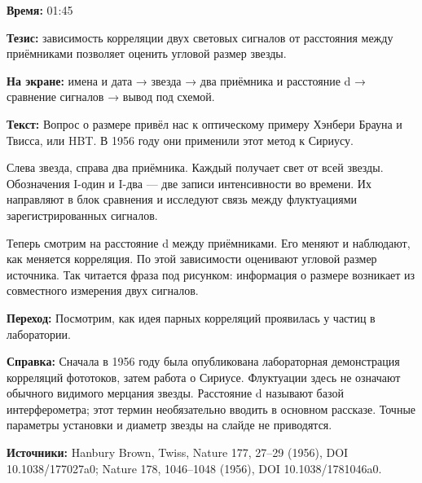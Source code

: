 \textbf{Время:} 01:45

\textbf{Тезис:} зависимость корреляции двух световых сигналов от расстояния между приёмниками позволяет оценить угловой размер звезды.

\textbf{На экране:} имена и дата → звезда → два приёмника и расстояние d → сравнение сигналов → вывод под схемой.

\textbf{Текст:} Вопрос о размере привёл нас к оптическому примеру Хэнбери Брауна и Твисса, или HBT. В 1956 году они применили этот метод к Сириусу.

Слева звезда, справа два приёмника. Каждый получает свет от всей звезды. Обозначения I-один и I-два — две записи интенсивности во времени. Их направляют в блок сравнения и исследуют связь между флуктуациями зарегистрированных сигналов.

Теперь смотрим на расстояние d между приёмниками. Его меняют и наблюдают, как меняется корреляция. По этой зависимости оценивают угловой размер источника. Так читается фраза под рисунком: информация о размере возникает из совместного измерения двух сигналов.

\textbf{Переход:} Посмотрим, как идея парных корреляций проявилась у частиц в лаборатории.

\textbf{Справка:} Сначала в 1956 году была опубликована лабораторная демонстрация корреляций фототоков, затем работа о Сириусе. Флуктуации здесь не означают обычного видимого мерцания звезды. Расстояние d называют базой интерферометра; этот термин необязательно вводить в основном рассказе. Точные параметры установки и диаметр звезды на слайде не приводятся.

\textbf{Источники:} Hanbury Brown, Twiss, Nature 177, 27–29 (1956), DOI 10.1038/177027a0; Nature 178, 1046–1048 (1956), DOI 10.1038/1781046a0.
